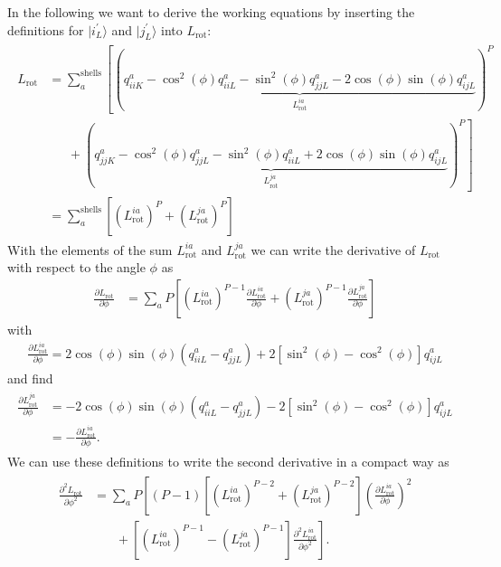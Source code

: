 In the following we want to derive the working equations by inserting the definitions for $|i_L^{\prime}\rangle$
and $|j_L^{\prime}\rangle$ into $L_\mathrm{rot}$:
\begin{align}
  \begin{split}
    L_\mathrm{rot} &= \sum_a^\mathrm{shells}\left[
        \left(\underbrace{q_{iiK}^a-\cos^2(\phi)q_{iiL}^a-\sin^2(\phi)q_{jjL}^a-2\cos(\phi)\sin(\phi)q_{ijL}^a}
        _{L_\mathrm{rot}^{ia}}\right)^P\right.\\
        &~~~~~~~+\left.
        \left(\underbrace{q_{jjK}^a-\cos^2(\phi)q_{jjL}^a-\sin^2(\phi)q_{iiL}^a+2\cos(\phi)\sin(\phi)q_{ijL}^a}
        _{L_\mathrm{rot}^{ja}}\right)^P\right]\\
                   &=\sum_a^\mathrm{shells}\left[
                   \left(L_\mathrm{rot}^{ia}\right)^P+ \left(L_\mathrm{rot}^{ja}\right)^P
                   \right]
  \end{split}
\end{align}
With the elements of the sum $L_\mathrm{rot}^{ia}$ and $L_\mathrm{rot}^{ja}$ we can write the derivative of
$L_\mathrm{rot}$ with respect to the angle $\phi$ as
\begin{align}
  \frac{\partial L_\mathrm{rot} }{\partial \phi} &= \sum_a P \left[
        \left(L_\mathrm{rot}^{ia}\right)^{P-1} \frac{\partial L_\mathrm{rot}^{ia}}{\partial \phi}+
        \left(L_\mathrm{rot}^{ja}\right)^{P-1} \frac{\partial L_\mathrm{rot}^{ja}}{\partial \phi}
                                                   \right]
\end{align}
with
\begin{align}
  \frac{\partial L_\mathrm{rot}^{ia}}{\partial \phi} = 2\cos(\phi)\sin(\phi)(q_{iiL}^a-q_{jjL}^a)
                                                     +2[\sin^2(\phi)-\cos^2(\phi)]q_{ijL}^a
\end{align}
and find
\begin{align}
  \begin{split}
    \frac{\partial L_\mathrm{rot}^{ja}}{\partial \phi} &= -2\cos(\phi)\sin(\phi)(q_{iiL}^a-q_{jjL}^a)
                                                         -2[\sin^2(\phi)-\cos^2(\phi)]q_{ijL}^a\\
                                                       &= -\frac{\partial L_\mathrm{rot}^{ia}}{\partial \phi}.
  \end{split}
\end{align}
We can use these definitions to write the second derivative in a compact way as
\begin{align}
  \begin{split}
    \frac{\partial^2 L_\mathrm{rot}}{\partial \phi^2} &= \sum_a P\left[
         (P-1)\left[\left(L_\mathrm{rot}^{ia} \right)^{P-2}+\left(L_\mathrm{rot}^{ja} \right)^{P-2}\right]
         \left(\frac{\partial L_\mathrm{rot}^{ia}}{\partial \phi}\right)^2\right.\\
        &\left.~~~~~~~~+\left[\left(L_\mathrm{rot}^{ia}\right)^{P-1}-\left(L_\mathrm{rot}^{ja}\right)^{P-1}\right]
         \frac{\partial^2 L_  \mathrm{rot}^{ia}}{\partial \phi^2}
    \right].
  \end{split}
\end{align}
